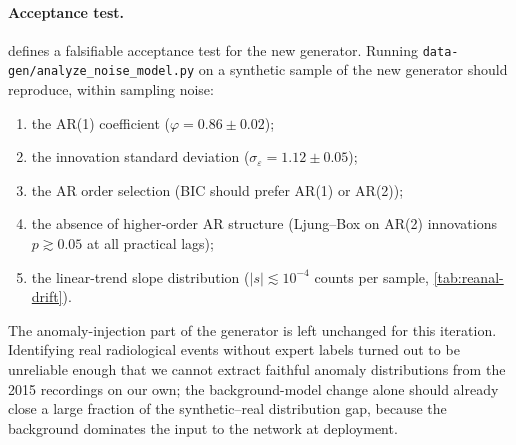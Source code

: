 \paragraph{Acceptance test.}
 defines a falsifiable acceptance test for
the new generator. Running
\texttt{data-gen/analyze\_noise\_model.py} on a synthetic sample of
the new generator should reproduce, within sampling noise:
\begin{enumerate}[leftmargin=*, itemsep=0.2em]
    \item the AR(1) coefficient ($\varphi = 0.86 \pm 0.02$);
    \item the innovation standard deviation
    ($\sigma_\varepsilon = 1.12 \pm 0.05$);
    \item the AR order selection (BIC should prefer AR(1) or AR(2));
    \item the absence of higher-order AR structure
    (Ljung--Box on AR(2) innovations $p \gtrsim 0.05$ at all
    practical lags);
    \item the linear-trend slope distribution
    ($|s| \lesssim 10^{-4}$ counts per sample,
    \cref{tab:reanal-drift}).
\end{enumerate}

The anomaly-injection part of the generator is left unchanged for
this iteration. Identifying real radiological events without expert
labels turned out to be unreliable enough that we cannot extract
faithful anomaly distributions from the 2015 recordings on our own;
the background-model change alone should already close a large
fraction of the synthetic--real distribution gap, because the
background dominates the input to the network at deployment.
